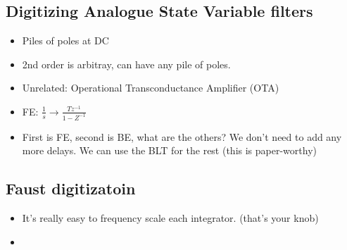 \subsection*{Digitizing Analogue State Variable filters}
\begin{itemize}
\item{
Piles of poles at DC
}
\item{
2nd order is arbitray, can have any pile of poles.
}
\item{
Unrelated: Operational Transconductance Amplifier (OTA)
}
\item{
FE: $\frac{1}{s} \rightarrow \frac{Tz^{-1}}{1 - Z^{-1}}$
}
\item{
First is FE, second is BE, what are the others? We don't need to add any more delays. 
We can use the BLT for the rest (this is paper-worthy)
}
\end{itemize}
\subsection*{Faust digitizatoin}
\begin{itemize}
\item{
    It's really easy to frequency scale each integrator.  (that's your knob)
}
\item{

}
\end{itemize}
